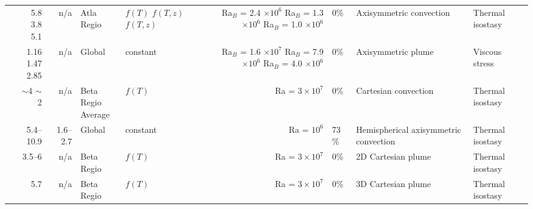 \begin{landscape}
\begin{longtable}{ @{} p{4cm} r r p{2cm} p{2cm} r p{1.5cm} p{3.2cm} p{3.1cm} @{} }
\citet{Moresi1995} & \makecell[tr]{5.8 \\ 3.8 \\ 5.1} & n/a & Atla Regio  &  \makecell[tl]{$f(T)$ \\ $f(T,z)$ \\ $f(T,z)$} & \makecell[tr]{Ra$_B$ = 2.4 $\times 10^6$ \\ Ra$_B$ = 1.3 $\times 10^6$ \\ Ra$_B$ = 1.0 $\times 10^6$} & 0\% & Axisymmetric convection & Thermal isostasy  \\

\citet{Nimmo1996} &  \makecell[tr]{1.16 \\ 1.47 \\ 2.85}  &  n/a  & Global & constant & \makecell[tr]{Ra$_B$ = 1.6 $\times 10^7$ \\  Ra$_B$ = 7.9 $\times 10^6$\\ Ra$_B$ = 4.0 $\times 10^6$ } & 0\% & Axisymmetric plume & Viscous stress \\



\citet{Solomatov1996a} & \makecell[tl]{$\sim$4 \\ $\sim$2} & n/a  & \makecell[cl]{Beta Regio \\ Average} & $f(T)$  & Ra = $3 \times 10^7$  & 0\% & Cartesian convection & Thermal isostasy  \\



\citet{Kiefer1998} &  5.4--10.9 & 1.6--2.7  & Global & constant & Ra = $10^6$ & 73 \% & Hemispherical axisymmetric convection & Thermal isostasy \\

\citet{Vezolainen2003} & 3.5--6 & n/a & Beta Regio & $f(T)$  & Ra = $3 \times 10^7$ & 0\% & 2D Cartesian plume & Thermal isostasy  \\

\citet{Vezolainen2004} & 5.7 & n/a & Beta Regio & $f(T)$  & Ra = $3 \times 10^7$ & 0\% & 3D Cartesian plume & Thermal isostasy  \\




\end{longtable}
\end{landscape}
